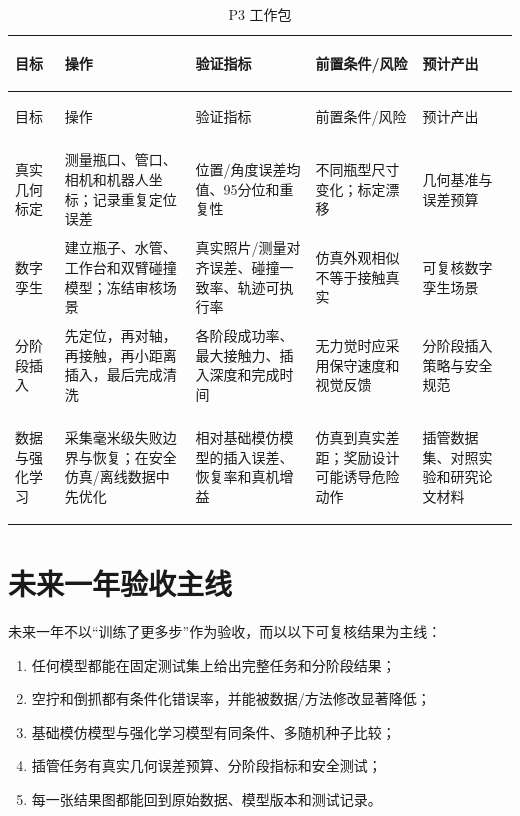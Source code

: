 \begingroup\small\setlength{\tabcolsep}{2pt}
\begin{longtable}{>{\bfseries\raggedright\arraybackslash}p{16mm}>{\raggedright\arraybackslash}p{25mm}>{\raggedright\arraybackslash}p{36mm}>{\raggedright\arraybackslash}p{31mm}>{\raggedright\arraybackslash}p{28mm}}
\caption{P3 工作包}\\
\toprule
目标 & 操作 & 验证指标 & 前置条件/风险 & 预计产出\\
\midrule\endfirsthead
\toprule
目标 & 操作 & 验证指标 & 前置条件/风险 & 预计产出\\
\midrule\endhead
真实几何标定 &
测量瓶口、管口、相机和机器人坐标；记录重复定位误差 &
位置/角度误差均值、95分位和重复性 &
不同瓶型尺寸变化；标定漂移 &
几何基准与误差预算\\
\addlinespace
数字孪生 &
建立瓶子、水管、工作台和双臂碰撞模型；冻结审核场景 &
真实照片/测量对齐误差、碰撞一致率、轨迹可执行率 &
仿真外观相似不等于接触真实 &
可复核数字孪生场景\\
\addlinespace
分阶段插入 &
先定位，再对轴，再接触，再小距离插入，最后完成清洗 &
各阶段成功率、最大接触力、插入深度和完成时间 &
无力觉时应采用保守速度和视觉反馈 &
分阶段插入策略与安全规范\\
\addlinespace
数据与强化学习 &
采集毫米级失败边界与恢复；在安全仿真/离线数据中先优化 &
相对基础模仿模型的插入误差、恢复率和真机增益 &
仿真到真实差距；奖励设计可能诱导危险动作 &
插管数据集、对照实验和研究论文材料\\
\bottomrule
\end{longtable}
\endgroup

\section{未来一年验收主线}

未来一年不以“训练了更多步”作为验收，而以以下可复核结果为主线：

\begin{enumerate}
  \item 任何模型都能在固定测试集上给出完整任务和分阶段结果；
  \item 空拧和倒抓都有条件化错误率，并能被数据/方法修改显著降低；
  \item 基础模仿模型与强化学习模型有同条件、多随机种子比较；
  \item 插管任务有真实几何误差预算、分阶段指标和安全测试；
  \item 每一张结果图都能回到原始数据、模型版本和测试记录。
\end{enumerate}
